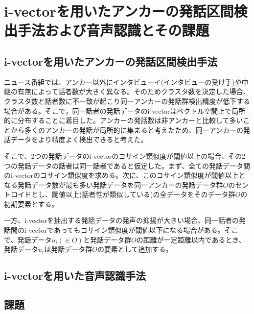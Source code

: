 \chapter{i-vectorを用いたアンカーの発話区間検出手法および音声認識とその課題}

\section{i-vectorを用いたアンカーの発話区間検出手法}
\label{section:clustering}
ニュース番組では、アンカー以外にインタビューイ(インタビューの受け手)や中継の有無によって話者数が大きく異なる。そのためクラスタ数を決定した場合、クラスタ数と話者数に不一致が起こり同一アンカーの発話群検出精度が低下する場合がある。そこで，同一話者の発話データのi-vectorはベクトル空間上で局所的に分布することに着目した。アンカーの発話数は非アンカーと比較して多いことから多くのアンカーの発話が局所的に集まると考えたため、同一アンカーの発話データをより精度よく検出できると考えた。\par
そこで、2つの発話データのi-vectorのコサイン類似度が閾値以上の場合、その2つの発話データの話者は同一話者であると仮定した。まず、全ての発話データ間のi-vectorのコサイン類似度を求める。次に、このコサイン類似度が閾値以上となる発話データ数が最も多い発話データを同一アンカーの発話データ群$O$のセントロイドとし、閾値以上(話者性が類似している)の全データをそのデータ群$O$の初期要素とする。\par
一方、i-vectorを抽出する発話データの発声の抑揚が大きい場合、同一話者の発話間のi-vectorであってもコサイン類似度が閾値以下になる場合がある。そこで、発話データ$u_i(\in O)$と発話データ群$O$の距離が一定距離以内であるとき、発話データ$u_i$は発話データ群$O$の要素として追加する。

\section{i-vectorを用いた音声認識手法}

\section{課題}

